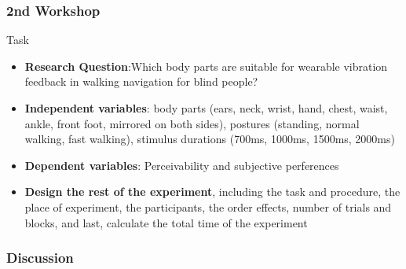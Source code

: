 \documentclass{beamer}
\begin{document}
\begin{frame}
	\frametitle{2nd Workshop}
	\begin{block}{Task}	
	\footnotesize
	\begin{itemize}
	\item \textbf{Research Question}:Which body parts are suitable for wearable vibration feedback in walking navigation for blind people?
	\item \textbf{Independent variables}: body parts (ears, neck, wrist, hand, chest, waist, ankle, front foot, mirrored on both sides), postures (standing, normal walking, fast walking), stimulus durations (700ms, 1000ms, 1500ms, 2000ms)
	\item \textbf{Dependent variables}: Perceivability and subjective perferences
	\item \textbf{Design the rest of the experiment}, including the task and procedure, the place of experiment, the participants, the order effects, number of trials and blocks, and last, calculate the total time of the experiment
	\end{itemize}
	\end{block}
\end{frame}

\begin{frame}
	\frametitle{Discussion}
\end{frame}

\end{document}
